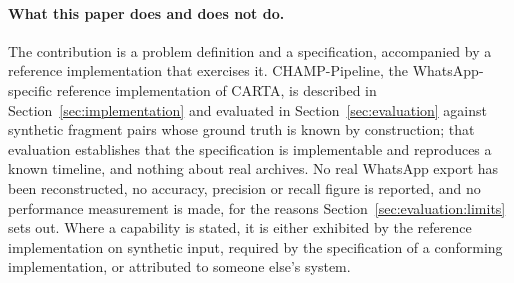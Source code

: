 \paragraph{What this paper does and does not do.}
The contribution is a problem definition and a specification, accompanied by
a reference implementation that exercises it. CHAMP-Pipeline, the
WhatsApp-specific reference implementation of CARTA, is described in
Section~\ref{sec:implementation} and evaluated in
Section~\ref{sec:evaluation} against synthetic fragment pairs whose ground
truth is known by construction; that evaluation establishes that the
specification is implementable and reproduces a known timeline, and nothing
about real archives. No real WhatsApp export has been reconstructed, no
accuracy, precision or recall figure is reported, and no performance
measurement is made, for the reasons Section~\ref{sec:evaluation:limits} sets
out. Where a capability is stated, it is either exhibited by the reference
implementation on synthetic input, required by the specification of a
conforming implementation, or attributed to someone else's system.
